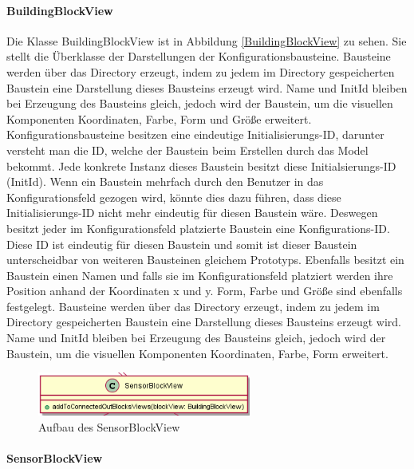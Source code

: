 \documentclass[parskip=full]{scrartcl}
\begin{document}
\paragraph{BuildingBlockView}


Die Klasse BuildingBlockView ist in Abbildung \ref{BuildingBlockView} zu sehen. Sie stellt die Überklasse der Darstellungen der Konfigurationsbausteine.
Bausteine werden über das Directory erzeugt, indem zu jedem im Directory gespeicherten Baustein eine Darstellung dieses Bausteins erzeugt wird. Name und InitId bleiben bei Erzeugung des Bausteins gleich, jedoch wird der Baustein, um die visuellen Komponenten Koordinaten, Farbe, Form und Größe erweitert.
Konfigurationsbausteine besitzen eine eindeutige Initialisierungs-ID, darunter versteht man die ID, welche der Baustein beim Erstellen durch das Model bekommt. Jede konkrete Instanz dieses Baustein besitzt diese Initialsierungs-ID (InitId). Wenn ein Baustein mehrfach durch den Benutzer in das Konfigurationsfeld gezogen wird, könnte dies dazu führen, dass diese Initialisierungs-ID nicht mehr eindeutig für diesen Baustein wäre. Deswegen besitzt jeder im Konfigurationsfeld platzierte Baustein eine Konfigurations-ID. Diese ID ist eindeutig für diesen Baustein und somit ist dieser Baustein unterscheidbar von weiteren Bausteinen gleichem Prototyps. Ebenfalls besitzt ein Baustein einen Namen und falls sie im Konfigurationsfeld platziert werden ihre Position anhand der Koordinaten x und y. Form, Farbe und Größe sind ebenfalls festgelegt.  
Bausteine werden über das Directory erzeugt, indem zu jedem im Directory gespeicherten Baustein eine Darstellung dieses Bausteins erzeugt wird. Name und InitId bleiben bei Erzeugung des Bausteins gleich, jedoch wird der Baustein, um die visuellen Komponenten Koordinaten, Farbe, Form erweitert.


\begin{figure}[htbp]
	\begin{center}
		\includegraphics[width = 7cm]{Grafiken/View/SensorBlockView.png}
		\caption{Aufbau des SensorBlockView}
		\label{Entwurf_Grob}
	\end{center}
\end{figure}

\paragraph{SensorBlockView}
\end{document}
